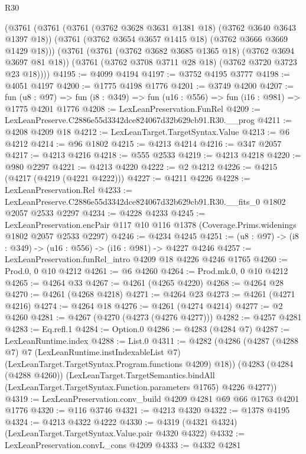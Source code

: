 \begin{lexlean}{R30}
\begin{coremodule}
    (@3761
      (@3761
        (@3761 (@3762 @3628 @3631 @1381 @18) (@3762 @3640 @3643 @1397 @18))
        (@3761 (@3762 @3654 @3657 @1415 @18) (@3762 @3666 @3669 @1429 @18)))
      (@3761
        (@3761 (@3762 @3682 @3685 @1365 @18) (@3762 @3694 @3697 @81 @18))
        (@3761 (@3762 @3708 @3711 @28 @18) (@3762 @3720 @3723 @23 @18))))
@4195 := @4099 @4194
@4197 := @3752 @4195 @3777
@4198 := @4051 @4197
@4200 := @1775 @4198 @1776
@4201 := @3749 @4200
@4207 := fun (u8 : @97) =>
  fun (i8 : @349) => fun (u16 : @556) => fun (i16 : @981) => @1775 @4201 @1776
@4208 := LexLeanPreservation.FunRel
@4209 := LexLeanPreserve.C2886e55d3342dce824067d32b629cb91.R30.__prog
@4211 := @4208 @4209 @18
@4212 := LexLeanTarget.TargetSyntax.Value
@4213 := @6 @4212
@4214 := @96 @1802
@4215 := @4213 @4214
@4216 := @347 @2057
@4217 := @4213 @4216
@4218 := @555 @2533
@4219 := @4213 @4218
@4220 := @980 @2297
@4221 := @4213 @4220
@4222 := @2 @4212
@4226 := @4215 (@4217 (@4219 (@4221 @4222)))
@4227 := @4211 @4226
@4228 := LexLeanPreservation.Rel
@4233 := LexLeanPreserve.C2886e55d3342dce824067d32b629cb91.R30.__fits_0 @1802 @2057 @2533 @2297
@4234 := @4228 @4233
@4245 := LexLeanPreservation.encPair
    @117
    @10
    @116
    @1378
    (Coverage.Prims.widenings @1802 @2057 @2533 @2297)
@4246 := @4234 @4245
@4251 := (u8 : @97) -> (i8 : @349) -> (u16 : @556) -> (i16 : @981) -> @4227 @4246
@4257 := LexLeanPreservation.funRel_intro @4209 @18 @4226 @4246 @1765
@4260 := Prod.{0, 0} @10 @4212
@4261 := @6 @4260
@4264 := Prod.mk.{0, 0} @10 @4212
@4265 := @4264 @33
@4267 := @4261 (@4265 @4220)
@4268 := @4264 @28
@4270 := @4261 (@4268 @4218)
@4271 := @4264 @23
@4273 := @4261 (@4271 @4216)
@4274 := @4264 @18
@4276 := @4261 (@4274 @4214)
@4277 := @2 @4260
@4281 := @4267 (@4270 (@4273 (@4276 @4277)))
@4282 := @4257 @4281
@4283 := Eq.refl.{1}
@4284 := Option.{0}
@4286 := @4283 (@4284 @7)
@4287 := LexLeanRuntime.index
@4288 := List.{0}
@4311 := @4282
    (@4286
      (@4287
        (@4288 @7)
        @7
        (LexLeanRuntime.instIndexableList @7)
        (LexLeanTarget.TargetSyntax.Program.functions @4209)
        @18))
    (@4283
      (@4284 (@4288 @4260))
      (LexLeanTarget.TargetSemantics.bindAll
        (LexLeanTarget.TargetSyntax.Function.parameters @1765)
        @4226
        @4277))
@4319 := LexLeanPreservation.conv_build @4209 @4281 @69 @66 @1763 @4201 @1776
@4320 := @116 @3746
@4321 := @4213 @4320
@4322 := @1378 @4195
@4324 := @4213 @4322 @4222
@4330 := @4319 (@4321 @4324) (LexLeanTarget.TargetSyntax.Value.pair @4320 @4322)
@4332 := LexLeanPreservation.convL_cons @4209
@4333 := @4332 @4281

\end{coremodule}
\end{lexlean}
